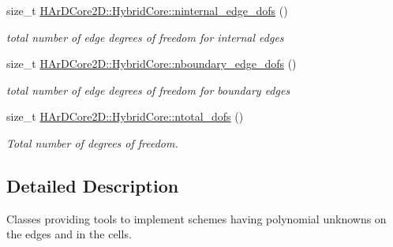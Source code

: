 \begin{DoxyCompactItemize}
size\+\_\+t \hyperlink{group__HybridCore_gae6e771ab58f248db8f051d47de982cf5}{H\+Ar\+D\+Core2\+D\+::\+Hybrid\+Core\+::ninternal\+\_\+edge\+\_\+dofs} ()
\begin{DoxyCompactList}\small\item\em total number of edge degrees of freedom for internal edges \end{DoxyCompactList}\item 
\mbox{\label{group__HybridCore_ga5fd63afc45211d3005f6e25682c533b2}} 
size\+\_\+t \hyperlink{group__HybridCore_ga5fd63afc45211d3005f6e25682c533b2}{H\+Ar\+D\+Core2\+D\+::\+Hybrid\+Core\+::nboundary\+\_\+edge\+\_\+dofs} ()
\begin{DoxyCompactList}\small\item\em total number of edge degrees of freedom for boundary edges \end{DoxyCompactList}\item 
\mbox{\label{group__HybridCore_ga728e5b5aa3675a64e7dbc593ed9761f8}} 
size\+\_\+t \hyperlink{group__HybridCore_ga728e5b5aa3675a64e7dbc593ed9761f8}{H\+Ar\+D\+Core2\+D\+::\+Hybrid\+Core\+::ntotal\+\_\+dofs} ()
\begin{DoxyCompactList}\small\item\em Total number of degrees of freedom. \end{DoxyCompactList}\end{DoxyCompactItemize}


\subsection{Detailed Description}
Classes providing tools to implement schemes having polynomial unknowns on the edges and in the cells. 

